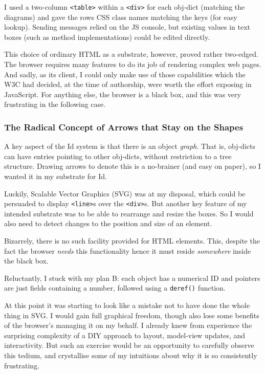 I used a two-column \texttt{\textless{}table\textgreater{}} within a
\texttt{\textless{}div\textgreater{}} for each obj-dict (matching the
diagrams) and gave the rows CSS class names matching the keys (for easy
lookup). Sending messages relied on the JS console, but existing values
in text boxes (such as method implementations) could be edited directly.

This choice of ordinary HTML as a substrate, however, proved rather
two-edged. The browser requires many features to do its job of rendering
complex web pages. And sadly, as its client, I could only make use of
those capabilities which the W3C had decided, at the time of authorship,
were worth the effort exposing in JavaScript. For anything else, the
browser is a black box, and this was very frustrating in the following
case.

\hypertarget{the-radical-concept-of-arrows-that-stay-on-the-shapes}{%
\subsubsection{The Radical Concept of Arrows that Stay on the
Shapes}\label{the-radical-concept-of-arrows-that-stay-on-the-shapes}}

A key aspect of the Id{} system is that there is an object \emph{graph}.
That is, obj-dicts can have entries pointing to other obj-dicts, without
restriction to a tree structure. Drawing arrows to denote this is a
no-brainer (and easy on paper), so I wanted it in my substrate for Id{}.

Luckily, Scalable Vector Graphics (SVG) was at my disposal, which could
be persuaded to display \texttt{\textless{}line\textgreater{}}s over the
\texttt{\textless{}div\textgreater{}}s. But another key feature of my
intended substrate was to be able to rearrange and resize the boxes. So
I would also need to detect changes to the position and size of an
element.

Bizarrely, there is no such facility provided for HTML elements. This,
despite the fact the browser \emph{needs} this functionality hence it
must reside \emph{somewhere} inside the black box.

Reluctantly, I stuck with my plan B: each object has a numerical ID and
pointers are just fields containing a number, followed using a
\texttt{deref()} function.

At this point it was starting to look like a mistake not to have done
the whole thing in SVG. I would gain full graphical freedom, though also
lose some benefits of the browser's managing it on my behalf. I already
knew from experience the surprising complexity of a DIY approach to
layout, model-view updates, and interactivity. But such an exercise
would be an opportunity to carefully observe this tedium, and
crystallise some of my intuitions about why it is so consistently
frustrating.

